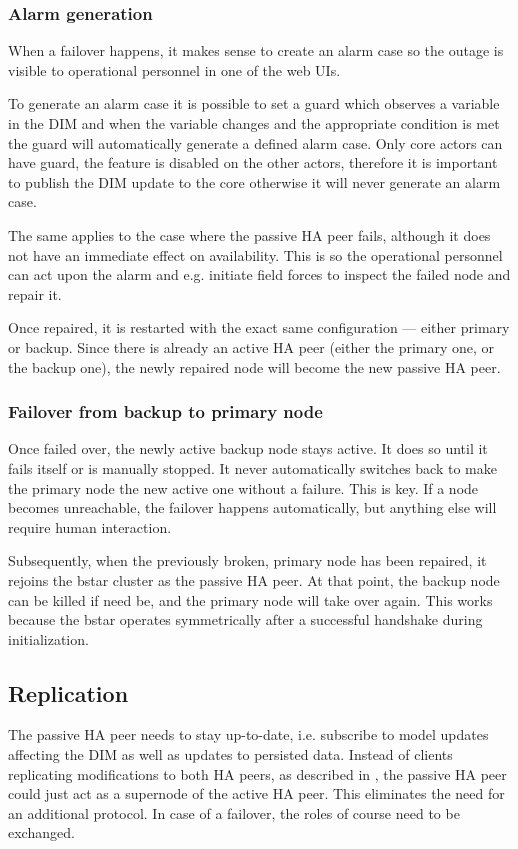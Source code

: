 \subsubsection{Alarm generation}
When a failover happens, it makes sense to create an alarm case
so the outage is visible to operational personnel in one of the web UIs.

To generate an alarm case it is possible to set a guard which observes
a variable in the DIM and when the variable changes and the appropriate 
condition is met the guard will automatically generate a defined alarm case.
Only core actors can have guard, the feature is disabled on the other actors,
therefore it is important to publish the DIM update to the core otherwise
it will never generate an alarm case.

The same applies to the case where the passive HA peer fails, although it
does not have an immediate effect on availability.  This is so the operational
personnel can act upon the alarm and e.g. initiate field forces to inspect the
failed node and repair it.

Once repaired, it is restarted with the exact same configuration --- either primary
or backup. Since there is already an active HA peer (either the primary one,
or the backup one), the newly repaired node will become the new passive HA peer.

\subsubsection{Failover from backup to primary node}
Once failed over, the newly active backup node stays active. It does so until it
fails itself or is manually stopped. It never automatically switches back to
make the primary node the new active one without a failure. This is key. If a
node becomes unreachable, the failover happens automatically, but anything else will
require human interaction.

Subsequently, when the previously broken, primary node has been repaired, it
rejoins the \gls{bstar} cluster as the passive HA peer. At that point, the backup
node can be killed if need be, and the primary node will take over again.  This
works because the \gls{bstar} operates symmetrically after a successful
handshake during initialization.

\subsection{Replication}
The passive HA peer needs to stay up-to-date, i.e. subscribe to model updates
affecting the DIM as well as updates to persisted data.
Instead of clients replicating modifications to both HA peers, as
described in \cite[Chapter 5 - Advanced Pub-Sub Patterns, The Clustered Hashmap
Protocol]{zmq:zguide}, the passive HA peer could just act as a supernode of the
active HA peer. This eliminates the need for an additional protocol. In case of
a failover, the roles of course need to be exchanged.

